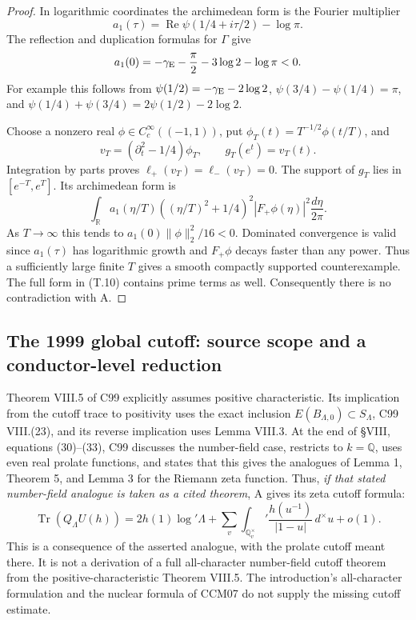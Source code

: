 \begin{proof}
In logarithmic coordinates the archimedean form is
the Fourier multiplier
\[
 a_1(\tau)=\operatorname{Re}\psi(1/4+i\tau/2)-\log\pi.
\]
The reflection and duplication formulas for
\(\Gamma\) give
\[
 a_1(0)=-\gamma_{\rm E}-\frac\pi2-3\log2-\log\pi<0.
\]
For example this follows from
\(\psi(1/2)=-\gamma_{\rm E}-2\log2\),
\(\psi(3/4)-\psi(1/4)=\pi\), and
\(\psi(1/4)+\psi(3/4)=2\psi(1/2)-2\log2\).

Choose a nonzero real \(\phi\in C_c^\infty((-1,1))\),
put \(\phi_T(t)=T^{-1/2}\phi(t/T)\), and
\[
 v_T=(\partial_t^2-1/4)\phi_T,\qquad g_T(e^t)=v_T(t).
\]
Integration by parts proves
\(\ell_+(v_T)=\ell_-(v_T)=0\).
The support of \(g_T\) lies in \([e^{-T},e^T]\).
Its archimedean form is
\[
 \int_{\mathbb R} a_1(\eta/T)
    ((\eta/T)^2+1/4)^2
       |F_+\phi(\eta)|^2\frac{d\eta}{2\pi}.
\]
As \(T\to\infty\) this tends to
\(a_1(0)\|\phi\|_2^2/16<0\).
Dominated convergence is valid since \(a_1(\tau)\)
has logarithmic growth and \(F_+\phi\) decays
faster than any power. Thus a sufficiently large
finite \(T\) gives a smooth compactly supported
counterexample. The full form in (T.10) contains
prime terms as well. Consequently there is no
contradiction with A.
\end{proof}

\subsection{The 1999 global cutoff: source scope and a conductor-level reduction}

Theorem VIII.5 of C99 explicitly assumes positive
characteristic. Its implication from the cutoff
trace to positivity uses the exact inclusion
\(E(B_{\Lambda,0})\subset S_\Lambda\), C99 VIII.(23),
and its reverse implication uses Lemma VIII.3.
At the end of \S VIII, equations (30)--(33), C99
discusses the number-field case, restricts to
\(k=\mathbb Q\), uses even real prolate functions,
and states that this gives the analogues of
Lemma 1, Theorem 5, and Lemma 3 for the Riemann
zeta function. Thus, \emph{if that stated
number-field analogue is taken as a cited
theorem}, A gives its zeta cutoff formula:
\[
 \operatorname{Tr}(Q_\Lambda U(h))
 =2h(1)\log'\Lambda+
   \sum_v\int_{\mathbb Q_v^\times}'
        \frac{h(u^{-1})}{|1-u|}\,d^\times u+o(1).               \tag{T.20}
\]
This is a consequence of the asserted analogue,
with the prolate cutoff meant there. It is not a
derivation of a full all-character number-field
cutoff theorem from the positive-characteristic
Theorem VIII.5. The introduction's all-character
formulation and the nuclear formula of CCM07
do not supply the missing cutoff estimate.


